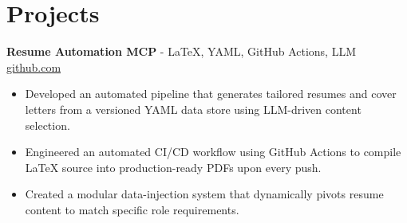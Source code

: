 \documentclass[11pt]{article}
\begin{document}

\vspace{-18.5pt}

\section*{Projects}

\textbf{Resume Automation MCP}{ - LaTeX, YAML, GitHub Actions, LLM} \hfill \href{https://github.com/Monica20030707/Tex_OrangeLeaf-mcp}{github.com} \\
\vspace{-9pt}
\begin{itemize}
  \item Developed an automated pipeline that generates tailored resumes and cover letters from a versioned YAML data store using LLM-driven content selection.
  \item Engineered an automated CI/CD workflow using GitHub Actions to compile LaTeX source into production-ready PDFs upon every push.
  \item Created a modular data-injection system that dynamically pivots resume content to match specific role requirements.
\end{itemize}
\end{document}
